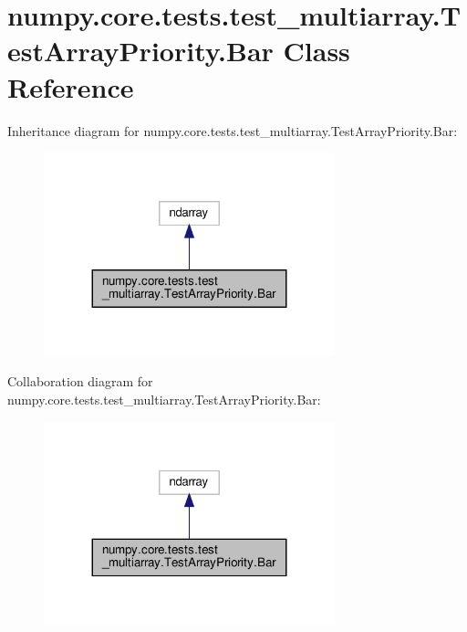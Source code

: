 \hypertarget{classnumpy_1_1core_1_1tests_1_1test__multiarray_1_1TestArrayPriority_1_1Bar}{}\section{numpy.\+core.\+tests.\+test\+\_\+multiarray.\+Test\+Array\+Priority.\+Bar Class Reference}
\label{classnumpy_1_1core_1_1tests_1_1test__multiarray_1_1TestArrayPriority_1_1Bar}


Inheritance diagram for numpy.\+core.\+tests.\+test\+\_\+multiarray.\+Test\+Array\+Priority.\+Bar\+:
\nopagebreak
\begin{figure}[H]
\begin{center}
\leavevmode
\includegraphics[width=239pt]{classnumpy_1_1core_1_1tests_1_1test__multiarray_1_1TestArrayPriority_1_1Bar__inherit__graph}
\end{center}
\end{figure}


Collaboration diagram for numpy.\+core.\+tests.\+test\+\_\+multiarray.\+Test\+Array\+Priority.\+Bar\+:
\nopagebreak
\begin{figure}[H]
\begin{center}
\leavevmode
\includegraphics[width=239pt]{classnumpy_1_1core_1_1tests_1_1test__multiarray_1_1TestArrayPriority_1_1Bar__coll__graph}
\end{center}
\end{figure}
